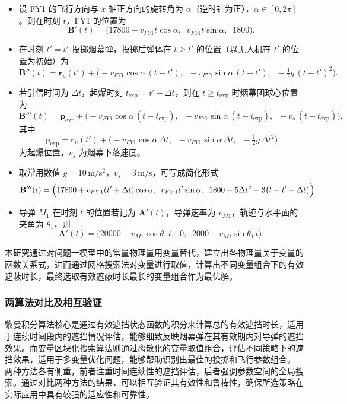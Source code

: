 \documentclass{article}
\begin{document}
\begin{itemize}
    \item 设 FY1 的飞行方向与 $x$ 轴正方向的旋转角为 $\alpha$（逆时针为正），$\alpha\in[0,2\pi]$。则在时刻 $t$，FY1 的位置为
    \[
    \mathbf{B}'(t) = \bigl(17800 + v_{FY1} t \cos\alpha,\;\; v_{FY1} t \sin\alpha,\;\; 1800\bigr).
    \]
    \item 在时刻 $t' = t'$ 投掷烟幕弹，投掷后弹体在 $t \ge t'$ 的位置（以无人机在 $t'$ 的位置为初始）为
    \[
    \mathbf{B}''(t) = \mathbf{r}_u(t') + \bigl(-v_{FY1} \cos\alpha\, (t-t'),\;\; -v_{FY1} \sin\alpha\, (t-t'),\;\; -\tfrac{1}{2}g\, (t-t')^2\bigr).
    \]
    \item 若引信时间为 $\Delta t$，起爆时刻 $t_{\mathrm{exp}} = t' + \Delta t$，则在 $t \ge t_{\mathrm{exp}}$ 时烟幕团球心位置为
    \[
    \mathbf{B}'''(t) = \mathbf{p}_{\mathrm{exp}} + \bigl(-v_{FY1} \cos\alpha\, (t-t_{\mathrm{exp}}),\;\; -v_{FY1} \sin\alpha\, (t-t_{\mathrm{exp}}),\;\; -v_s\, (t-t_{\mathrm{exp}})\bigr),
    \]
    其中
    \[
    \mathbf{p}_{\mathrm{exp}} = \mathbf{r}_u(t') + \bigl(-v_{FY1} \cos\alpha\, \Delta t,\;\; -v_{FY1} \sin\alpha\, \Delta t,\;\; -\tfrac{1}{2}g\, \Delta t^2\bigr)
    \]
    为起爆位置，$v_s$ 为烟幕下落速度。
    \item 取常用数值 $g = 10\,\mathrm{m/s^2}$，$v_s = 3\,\mathrm{m/s}$，可写成简化形式
    \[
    \mathbf{B}'''(t) = \Bigl(17800 + v_{FY1}(t' + \Delta t)\cos\alpha,\;\; v_{FY1} t' \sin\alpha,\;\; 1800 - 5\Delta t^{2} - 3\bigl(t - t' - \Delta t\bigr)\Bigr).
    \]
    \item 导弹 $M_1$ 在时刻 $t$ 的位置若记为 $\mathbf{A}'(t)$，导弹速率为 $v_{M1}$，轨迹与水平面的夹角为 $\theta_1$，则
    \[
    \mathbf{A}'(t) = \bigl(20000 - v_{M1} \cos\theta_1\, t,\;\; 0,\;\; 2000 - v_{M1} \sin\theta_1\, t\bigr).
    \]
\end{itemize}
本研究通过对问题一模型中的常量物理量用变量替代，建立出各物理量关于变量的函数关系式，进而通过网格搜索法对变量进行取值，计算出不同变量组合下的有效遮蔽时长，最终选取有效遮蔽时长最长的变量组合作为最优解。

\subsubsection{两算法对比及相互验证}
黎曼积分算法核心是通过有效遮挡状态函数的积分来计算总的有效遮挡时长，适用于连续时间段内的遮挡情况评估，能够细致反映烟幕弹在其有效期内对导弹的遮挡效果。而变量区块化搜索算法则通过离散化的变量取值组合，评估不同策略下的遮挡效果，适用于多变量优化问题，能够帮助识别出最佳的投掷和飞行参数组合。
两种方法各有侧重，前者注重时间连续性的遮挡评估，后者强调参数空间的全局搜索。通过对比两种方法的结果，可以相互验证其有效性和鲁棒性，确保所选策略在实际应用中具有较强的适应性和可靠性。
\end{document}
